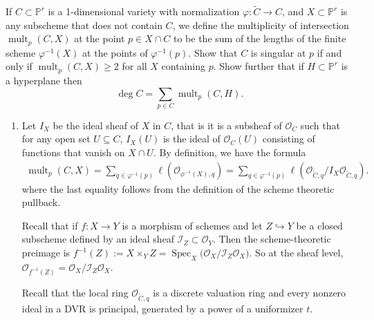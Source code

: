 \documentclass[12pt]{article}
\begin{document}
\begin{exercise}[POAC 2.2]
    If $C \subset \mathbb{P}^r$ is a 1-dimensional variety with normalization
    $\varphi : \widetilde{C} \to C$, and $X \subset \mathbb{P}^r$ is any subscheme that does not contain $C$, we define the multiplicity of intersection $\operatorname{mult}_p(C,X)$ at the point $p \in X \cap C$ to be the sum of the lengths of the finite scheme $\varphi^{-1}(X)$ at the points of $\varphi^{-1}(p)$.
    Show that $C$ is singular at $p$ if and only if
    $\operatorname{mult}_p(C,X) \geq 2$ for all $X$ containing $p$.
    Show further that if $H \subset \mathbb{P}^r$ is a hyperplane then
    \[
        \deg C = \sum_{p \in C} \operatorname{mult}_p(C,H).
    \]

\end{exercise}

\begin{solution}\leavevmode
    \begin{enumerate}
        \item Let $I_X$ be the ideal sheaf of $X$ in $C$, that is it is a subsheaf of $\mathcal{O}_C$ such that for any open set $U \subseteq C$, $I_X(U)$ is the ideal of $\mathcal{O}_C(U)$ consisting of functions that vanish on $X \cap U$. By definition, we have the formula \begin{align*}
                  \operatorname{mult}_p(C,X) =
                  \sum_{q \in \varphi^{-1}(p)} \ell(\mathcal{O}_{\phi^{-1}(X),q})
                  = \sum_{q \in \varphi^{-1}(p)} \ell(\mathcal{O}_{\widetilde{C},q}/I_X\mathcal{O}_{\widetilde{C},q}).
              \end{align*} where the last equality follows from the definition of the scheme theoretic pullback.

              Recall that if $f : X \to Y$ is a morphism of schemes and let $Z \hookrightarrow Y$ be a closed subscheme defined by an ideal sheaf $\mathcal I_Z \subset \mathcal O_Y$. Then the scheme-theoretic preimage is $f^{-1}(Z) := X \times_Y Z = \operatorname{Spec}_X\!\big( \mathcal O_X / \mathcal I_Z \mathcal O_X \big)$. So at the sheaf level, $\mathcal O_{f^{-1}(Z)} = \mathcal O_X / \mathcal I_Z \mathcal O_X$.

              Recall that the local ring $\mathcal{O}_{\tilde{C},q}$ is a discrete valuation ring and every nonzero ideal in a DVR is principal, generated by a power of a uniformizer $t$.


\end{enumerate}
\end{solution}
\end{document}
